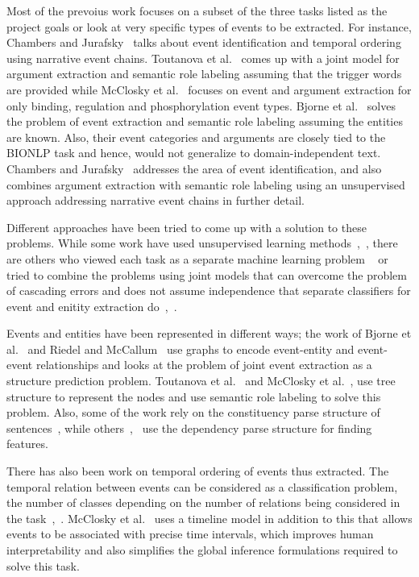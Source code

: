Most of the prevoius work focuses on a subset of the three tasks listed as the project goals or look at very specific types of events to be extracted.  For instance, Chambers and Jurafsky~ talks about event identification and temporal ordering using narrative event chains. Toutanova et al.~ comes up with a joint model for argument extraction and semantic role labeling assuming that the trigger words are provided while McClosky et al.~ focuses on event and argument extraction for only binding, regulation and phosphorylation event types. Bjorne et al.~ solves the problem of event extraction and semantic role labeling assuming the entities are known. Also, their event categories and arguments are closely tied to the BIONLP task and hence, would not generalize to domain-independent text. Chambers and Jurafsky~ addresses the area of event identification, and also combines argument extraction with semantic role labeling using an unsupervised approach addressing narrative event chains in further detail. 

Different approaches have been tried to come up with a solution to these problems. While some work have used unsupervised learning methods~\cite{chju2008},~\cite{chju2009}, there are others who viewed each task as a separate machine learning problem ~\cite{bjorne} or tried to combine the problems using joint models that can overcome the problem of cascading errors and does not assume independence that separate classifiers for event and enitity extraction do~\cite{toutanova},~\cite{riedelmc}.

Events and entities have been represented in different ways; the work of Bjorne et al.~ and Riedel and McCallum~ use graphs to encode event-entity and event-event relationships and looks at the problem of joint event extraction as a structure prediction problem. Toutanova et al.~ and McClosky et al.~, use tree structure to represent the nodes and use semantic role labeling to solve this problem. Also, some of the work rely on the constituency parse structure of sentences~\cite{toutanova}, while others~\cite{bjorne},~\cite{mcclosky} use the dependency parse structure for finding features. 

There has also been work on temporal ordering of events thus extracted. The temporal relation between events can be considered as a classification problem, the number of classes depending on the number of relations being considered in the task~,~. McClosky et al.~ uses a timeline model in addition to this that allows events to be associated with precise time intervals, which improves human interpretability and also simplifies the global inference formulations required to solve this task.	